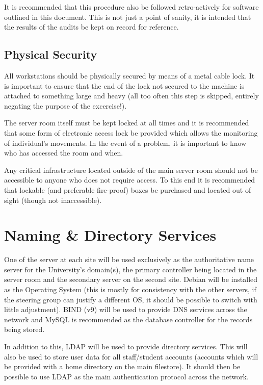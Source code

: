 \documentclass[a4paper, twoside]{article}
\begin{document}
It is recommended that this procedure also be followed retro-actively for
software outlined in this document. This is not just a point of sanity, it is
intended that the results of the audits be kept on record for reference.

\subsection{Physical Security}
All workstations should be physically secured by means of a metal cable lock. It
is important to ensure that the end of the lock not secured to the machine is
attached to something large and heavy (all too often this step is skipped,
entirely negating the purpose of the excercise!).

The server room itself must be kept locked at all times and it is recommended
that some form of electronic access lock be provided which allows the monitoring
of individual's movements. In the event of a problem, it is important to know
who has accessed the room and when.

Any critical infrastructure located outside of the main server room should not
be accessible to anyone who does not require access. To this end it is
recommended that lockable (and preferable fire-proof) boxes be purchased and
located out of sight (though not inaccessible).

\section{Naming \& Directory Services}
\label{sec:nandd}
One of the server at each site will be used exclusively as the authoritative name server for
the University's domain(s), the primary controller being located in the server
room and the secondary server on the second site. Debian will be installed as the Operating System
(this is mostly for consistency with the other servers, if the steering group
can justify a different OS, it should be possible to switch with little
adjustment). BIND (v9) will be used to provide DNS services across the network
and MySQL is recommended as the database controller for the records being
stored.

In addition to this, LDAP will be used to provide directory services. This will
also be used to store user data for all staff/student accounts (accounts which
will be provided with a home directory on the main filestore). It should then be
possible to use LDAP as the main authentication protocol across the network.
\end{document}

